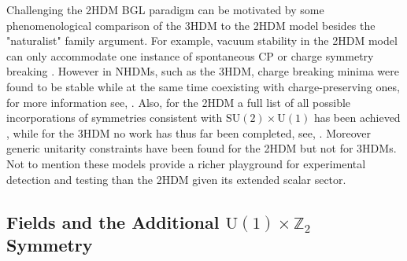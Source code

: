 Challenging the 2HDM BGL paradigm can be motivated by some phenomenological comparison of the 3HDM to the 2HDM model besides the "naturalist" family argument.
%
For example, vacuum stability in the 2HDM model can only accommodate one instance of spontaneous CP or charge symmetry breaking \cite{Branco_2012,Ferreira_2004,Barroso_2007}. 
%
However in NHDMs, such as the 3HDM, charge breaking minima were found to be stable while at the same time coexisting with charge-preserving ones, for more information see, \cite{Barroso_2006}.   
%
Also, for the 2HDM a full list of all possible incorporations of symmetries consistent with $\mathrm{SU(2)}\times\mathrm{U(1)}$ has been achieved \cite{Ivanov_2008,Ivanov2007}, while for the 3HDM no work has thus far been completed, see, \cite{Ivanov_2012,Ivanov_2015}. 
%
Moreover generic unitarity constraints have been found for the 2HDM \cite{Ginzburg_2005} but not for 3HDMs. 
%
Not to mention these models provide a richer playground for experimental detection and testing than the 2HDM given its extended scalar sector. 

\subsection{Fields and the Additional \texorpdfstring{ $\mathrm{U(1)}\times\mathbb{Z}_2$}{} Symmetry}

